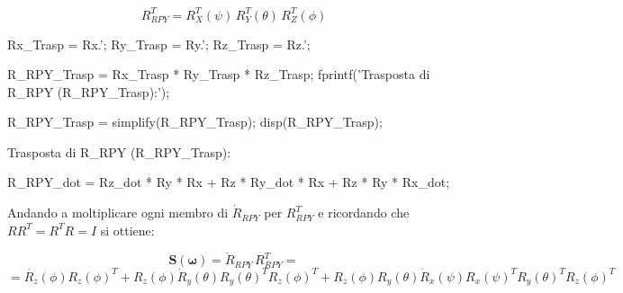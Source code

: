 \documentclass[11pt, a4paper]{article}
\begin{document}
\[
    R_{RPY}^T = R_X^T (\psi) \, R_Y^T (\theta) \, R_Z^T (\phi)
\]

\begin{matlabcode}
Rx_Trasp = Rx.';
Ry_Trasp = Ry.';
Rz_Trasp = Rz.';

R_RPY_Trasp = Rx_Trasp * Ry_Trasp * Rz_Trasp;
fprintf('Trasposta di R_RPY (R_RPY_Trasp):');

R_RPY_Trasp = simplify(R_RPY_Trasp);
disp(R_RPY_Trasp);
\end{matlabcode}
\begin{matlaboutput}
Trasposta di R_RPY (R_RPY_Trasp):
\end{matlaboutput}


\begin{matlabcode}
R_RPY_dot = Rz_dot * Ry * Rx + Rz * Ry_dot * Rx + Rz * Ry * Rx_dot;
\end{matlabcode}

\begin{par}
\begin{flushleft}
Andando a moltiplicare ogni membro di $\dot{R}_{RPY}$ per $R_{RPY}^T$ e ricordando che $RR^T =R^T R=I$ si ottiene:
\end{flushleft}
\end{par}

\[
    \mathbf{S}(\boldsymbol{\omega}) = \dot{R}_{RPY} \, R_{RPY}^T =
\]
\[
    =\dot{R_z } (\phi )R_z (\phi )^T +R_z (\phi ){\dot{R} }_y (\theta )R_y (\theta )^T R_z (\phi )^T +R_z (\phi )R_y (\theta ){\dot{R} }_x (\psi )R_x (\psi )^T R_y (\theta )^T R_z (\phi )^T
\]
\end{document}
